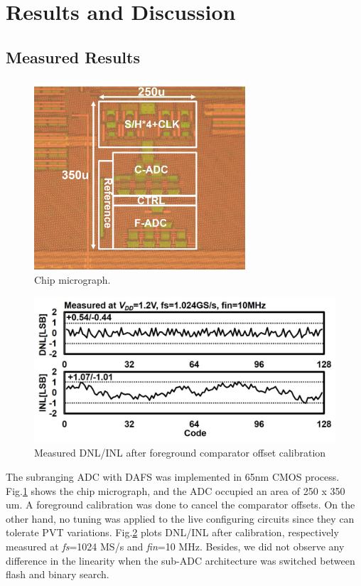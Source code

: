 \section{Results and Discussion}

\subsection{Measured Results}

\begin{figure}
\centering
  \includegraphics[width=0.7\textwidth]{figure/chap3/fig15.jpg}
  \caption{Chip micrograph.}
  \label{fig-3-15}
\end{figure}
\begin{figure}
\centering
  \includegraphics[width=1\textwidth]{figure/chap3/fig16.jpg}
  \caption{Measured DNL/INL after foreground comparator offset calibration}
  \label{fig-3-16}
\end{figure}


The subranging ADC with DAFS was implemented in 65nm CMOS process. Fig.\ref{fig-3-15} shows the chip micrograph, and the ADC occupied an area of 250 x 350 um. A foreground calibration was done to cancel the comparator offsets. On the other hand, no tuning was applied to the live configuring circuits since they can tolerate PVT variations. Fig.\ref{fig-3-16} plots DNL/INL after calibration, respectively measured at \textit{fs}=1024 MS/s and \textit{fin}=10 MHz. Besides, we did not observe any difference in the linearity when the sub-ADC architecture was switched between flash and binary search.

